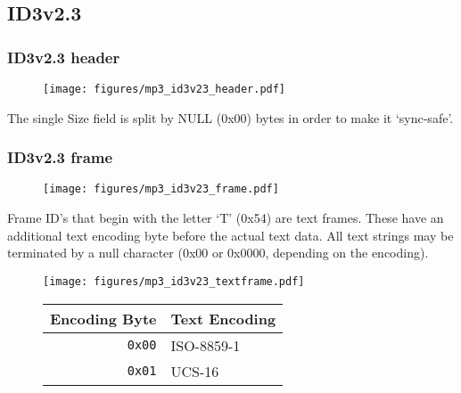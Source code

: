 \pagebreak

\subsection{ID3v2.3}
\subsubsection{ID3v2.3 header}
\begin{figure}[h]
\texttt{[image: figures/mp3\_id3v23\_header.pdf]}
\end{figure}
\par
\noindent
The single Size field is split by NULL (0x00) bytes in order to make
it `sync-safe'.

\subsubsection{ID3v2.3 frame}
\begin{figure}[h]
\texttt{[image: figures/mp3\_id3v23\_frame.pdf]}
\end{figure}
\par
\noindent
Frame ID's that begin with the letter `T' (0x54) are text frames.
These have an additional text encoding byte before the actual
text data.
All text strings may be terminated by a null character
(0x00 or 0x0000, depending on the encoding).
\begin{figure}[h]
\texttt{[image: figures/mp3\_id3v23\_textframe.pdf]}
\begin{tabular}{r|l}
Encoding Byte & Text Encoding \\
\hline
\texttt{0x00} & ISO-8859-1 \\
\texttt{0x01} & UCS-16 \\
\end{tabular}
\end{figure}

\pagebreak

